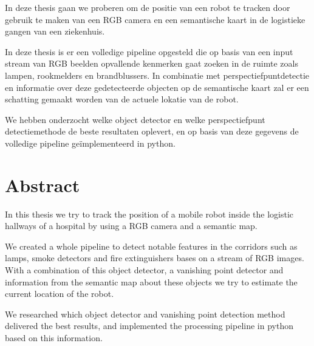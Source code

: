 In deze thesis gaan we proberen om de positie van een robot te tracken door gebruik te maken van een RGB camera en een semantische kaart
in de logistieke gangen van een ziekenhuis.

In deze thesis is er een volledige pipeline opgesteld die op basis van een input stream van RGB beelden opvallende kenmerken
gaat zoeken in de ruimte zoals lampen, rookmelders en brandblussers.
In combinatie met perspectiefpuntdetectie en informatie over deze gedetecteerde objecten op de semantische kaart zal er een
schatting gemaakt worden van de actuele lokatie van de robot.

We hebben onderzocht welke object detector en welke perspectiefpunt detectiemethode de beste resultaten oplevert, en op basis van
deze gegevens de volledige pipeline ge\"{i}mplementeerd in python.


\pagebreak
\chapter*{Abstract}

In this thesis we try to track the position of a mobile robot inside the logistic hallways of a hospital by using a RGB camera and a semantic map.

We created a whole pipeline to detect notable features in the corridors such as lamps, smoke detectors and fire extinguishers bases on a stream of RGB images.
With a combination of this object detector, a vanishing point detector and information from the semantic map about these objects we try to estimate
the current location of the robot.

We researched which object detector and vanishing point detection method delivered the best results, and implemented the processing pipeline
in python based on this information.
